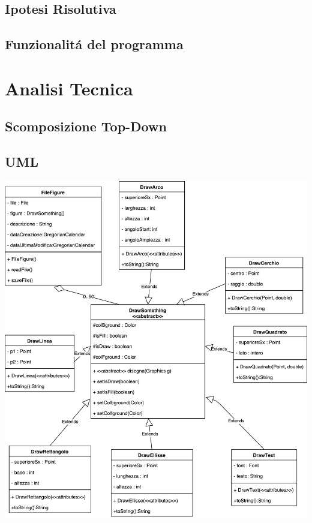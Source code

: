 \documentclass[a4paper,12pt,times,numbered,print,index]{article}
\begin{document}
\subsection{Ipotesi Risolutiva}

\subsection{Funzionalitá del programma}


\section{Analisi Tecnica}

\subsection{Scomposizione Top-Down}

\subsection{UML}
\begin{center}
	\includegraphics[scale=0.4]{Immagini/UML.pdf}
	\label{UML}
\end{center}
\end{document}
